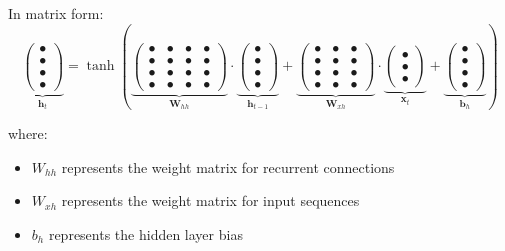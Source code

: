 In matrix form:
\begin{equation}
\underbrace{
\begin{pmatrix} \bullet \\ \bullet \\ \bullet \\ \bullet \end{pmatrix}
}_{\mathbf{h}_t}
= \tanh \left(
\underbrace{
\begin{pmatrix}
\bullet & \bullet & \bullet & \bullet \\
\bullet & \bullet & \bullet & \bullet \\
\bullet & \bullet & \bullet & \bullet \\
\bullet & \bullet & \bullet & \bullet
\end{pmatrix}
}_{\mathbf{W}_{hh}}
\cdot
\underbrace{
\begin{pmatrix} \bullet \\ \bullet \\ \bullet \\ \bullet \end{pmatrix}
}_{\mathbf{h}_{t-1}}
+
\underbrace{
\begin{pmatrix}
\bullet & \bullet & \bullet \\
\bullet & \bullet & \bullet \\
\bullet & \bullet & \bullet \\
\bullet & \bullet & \bullet
\end{pmatrix}
}_{\mathbf{W}_{xh}}
\cdot
\underbrace{
\begin{pmatrix} \bullet \\ \bullet \\ \bullet \end{pmatrix}
}_{\mathbf{x}_t}
+
\underbrace{
\begin{pmatrix} \bullet \\ \bullet \\ \bullet \\ \bullet \end{pmatrix}
}_{\mathbf{b}_h}
\right)
\end{equation}

where:
\begin{itemize}
\item $W_{hh}$ represents the weight matrix for recurrent connections
\item $W_{xh}$ represents the weight matrix for input sequences
\item $b_h$ represents the hidden layer bias
\end{itemize}


